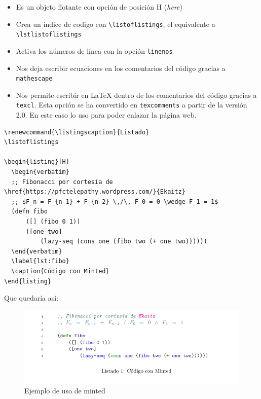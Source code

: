 \begin{itemize}
\item
  Es un objeto flotante con opción de posición H (\emph{here})
\item
  Crea un índice de codigo con \lstinline!\listoflistings!, el
  equivalente a \lstinline!\lstlistoflistings!
\item
  Activa los números de línea con la opción \lstinline!linenos!
\item
  Nos deja escribir ecuaciones en los comentarios del código gracias a
  \lstinline!mathescape!
\item
  Nos permite escribir en LaTeX dentro de los comentarios del código
  gracias a \lstinline!texcl!. Esta opción se ha convertido en
  \lstinline!texcomments! a partir de la versión 2.0. En este caso lo
  uso para poder enlazar la página web.
\end{itemize}

\begin{lstlisting}[language={[latex]tex}]
% Cambiamos Listing por Listado
\renewcommand{\listingscaption}{Listado}
\listoflistings

\begin{listing}[H]
  \begin{verbatim}
  ;; Fibonacci por cortesía de \href{https://pfctelepathy.wordpress.com/}{Ekaitz}
  ;; $F_n = F_{n-1} + F_{n-2} \,/\, F_0 = 0 \wedge F_1 = 1$
  (defn fibo
      ([] (fibo 0 1))
      ([one two]
          (lazy-seq (cons one (fibo two (+ one two))))))
  \end{verbatim}
  \label{lst:fibo}
  \caption{Código con Minted}
\end{listing}
\end{lstlisting}

Que quedaría así:

\begin{figure}[htbp]
\centering
\includegraphics[width=\textwidth]{docs/Figuras/fibo.png}
\caption{Ejemplo de uso de minted}
\end{figure}

